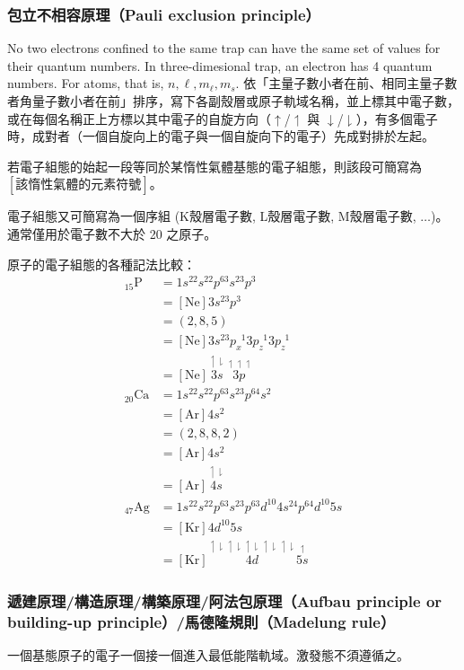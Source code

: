 \documentclass[a4paper,12pt]{report}
\begin{document}
\subsubsection{包立不相容原理（Pauli exclusion principle）}
No two electrons confined to the same trap can have the same set of values for their quantum numbers. In three-dimesional trap, an electron has 4 quantum numbers. For atoms, that is, $n,\ell,m_{\ell},m_s$.
依「主量子數小者在前、相同主量子數者角量子數小者在前」排序，寫下各副殼層或原子軌域名稱，並上標其中電子數，或在每個名稱正上方標以其中電子的自旋方向（$\uparrow$/$\upharpoonleft$ 與 $\downarrow$/$\downharpoonright$），有多個電子時，成對者（一個自旋向上的電子與一個自旋向下的電子）先成對排於左起。

若電子組態的始起一段等同於某惰性氣體基態的電子組態，則該段可簡寫為$\left[\text{該惰性氣體的元素符號}\right]$。

電子組態又可簡寫為一個序組 (K殼層電子數, L殼層電子數, M殼層電子數, $\ldots$)。通常僅用於電子數不大於 20 之原子。

原子的電子組態的各種記法比較：
\[\begin{aligned}
_{15}\mathrm{P}&=1s^22s^22p^63s^23p^3\\
&=[\mathrm{Ne}]3s^23p^3\\
&=(2,8,5)\\
&=[\mathrm{Ne}]3s^23p_x^{\phantom{x}1}3p_z^{\phantom{y}1}3p_z^{\phantom{z}1}\\
&=[\mathrm{Ne}]\overset{\upharpoonleft\downharpoonright}{3s}\overset{\upharpoonleft\upharpoonleft\upharpoonleft}{3p}\\
_{20}\mathrm{Ca}&=1s^22s^22p^63s^23p^64s^2\\
&=[\mathrm{Ar}]4s^2\\
&=(2,8,8,2)\\
&=[\mathrm{Ar}]4s^2\\
&=[\mathrm{Ar}]\overset{\upharpoonleft\downharpoonright}{4s}\\
_{47}\mathrm{Ag}&=1s^22s^22p^63s^23p^63d^{10}4s^24p^64d^{10}5s\\
&=[\mathrm{Kr}]4d^{10}5s\\
&=[\mathrm{Kr}]\overset{\upharpoonleft\downharpoonright\upharpoonleft\downharpoonright\upharpoonleft\downharpoonright\upharpoonleft\downharpoonright\upharpoonleft\downharpoonright}{4d}\overset{\upharpoonleft}{5s}
\end{aligned}\]
\subsubsection{遞建原理/構造原理/構築原理/阿法包原理（Aufbau principle or building-up principle）/馬德隆規則（Madelung rule）}
一個基態原子的電子一個接一個進入最低能階軌域。激發態不須遵循之。
\end{document}
